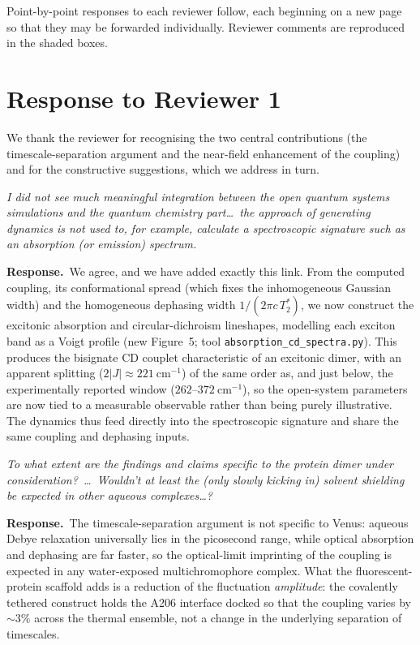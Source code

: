 \documentclass[11pt]{article}
\newcommand{\comment}[1]{\begin{revcomment}\itshape #1\end{revcomment}}
\newcommand{\response}[1]{\noindent\textbf{Response.}\ #1\par\vspace{6pt}}
\begin{document}
Point-by-point responses to each reviewer follow, each beginning on a new page so
that they may be forwarded individually. Reviewer comments are reproduced in the
shaded boxes.

\newpage
\section*{Response to Reviewer 1}

We thank the reviewer for recognising the two central contributions (the
timescale-separation argument and the near-field enhancement of the coupling) and for
the constructive suggestions, which we address in turn.

\comment{I did not see much meaningful integration between the open quantum systems
simulations and the quantum chemistry part\ldots\ the approach of generating dynamics
is not used to, for example, calculate a spectroscopic signature such as an absorption
(or emission) spectrum.}

\response{We agree, and we have added exactly this link. From the computed coupling,
its conformational spread (which fixes the inhomogeneous Gaussian width) and the
homogeneous dephasing width $1/(2\pi c\,T_2^{*})$, we now construct the excitonic
absorption and circular-dichroism lineshapes, modelling each exciton band as a Voigt
profile (new Figure~5; tool \texttt{absorption\_cd\_spectra.py}). This produces the bisignate CD couplet
characteristic of an excitonic dimer, with an apparent splitting ($2|J|\approx 221~\mathrm{cm^{-1}}$) of the same order as, and just below, the
experimentally reported window ($262$--$372~\mathrm{cm^{-1}}$), so the open-system parameters are now tied to a
measurable observable rather than being purely illustrative. The dynamics thus feed
directly into the spectroscopic signature and share the same coupling and dephasing
inputs.}

\comment{To what extent are the findings and claims specific to the protein dimer
under consideration?\ \ldots\ Wouldn't at least the (only slowly kicking in) solvent
shielding be expected in other aqueous complexes\ldots?}

\response{The timescale-separation argument is not specific to Venus: aqueous Debye
relaxation universally lies in the picosecond range, while optical absorption and
dephasing are far faster, so the optical-limit imprinting of the coupling is expected
in any water-exposed multichromophore complex. What the fluorescent-protein scaffold adds is a
reduction of the fluctuation \emph{amplitude}: the covalently tethered construct holds the
A206 interface docked so that the coupling varies by ${\sim}3\%$ across the thermal
ensemble, not a change in the underlying separation of timescales.}
\end{document}
